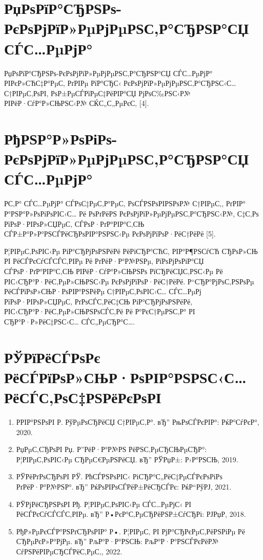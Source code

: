 \documentclass[referat, och, times]{SCWorks}
\begin{document}
	\section{РџРѕРїР°СЂРЅРѕ-РєРѕРјРїР»РµРјРµРЅС‚Р°СЂРЅР°СЏ СЃС…РµРјР°}
	РџРѕРїР°СЂРЅРѕ-РєРѕРјРїР»РµРјРµРЅС‚Р°СЂРЅР°СЏ СЃС…РµРјР° РІРєР»СЋС‡Р°РµС‚ РґРІРµ РїР°СЂС‹ РєРѕРјРїР»РµРјРµРЅС‚Р°СЂРЅС‹С… С†РІРµС‚РѕРІ, РѕР±РµСЃРїРµС‡РёРІР°СЏ РјРѕС‰РЅС‹Р№ РІРёР·СѓР°Р»СЊРЅС‹Р№ СЌС„С„РµРєС‚ [4].
	
	\section{РђРЅР°Р»РѕРіРѕ-РєРѕРјРїР»РµРјРµРЅС‚Р°СЂРЅР°СЏ СЃС…РµРјР°}
	Р­С‚Р° СЃС…РµРјР° СЃРѕС‡РµС‚Р°РµС‚ РѕСЃРЅРѕРІРЅРѕР№ С†РІРµС‚, РґРІР° Р°РЅР°Р»РѕРіРѕРІС‹С… Рё РѕРґРёРЅ РєРѕРјРїР»РµРјРµРЅС‚Р°СЂРЅС‹Р№, С‡С‚Рѕ РїРѕР·РІРѕР»СЏРµС‚ СЃРѕР·РґР°РІР°С‚СЊ СЃР±Р°Р»Р°РЅСЃРёСЂРѕРІР°РЅРЅС‹Рµ РєРѕРјРїРѕР·РёС†РёРё [5].
	
	\conclusion
	Р¦РІРµС‚РѕРІС‹Рµ РіР°СЂРјРѕРЅРёРё РёРіСЂР°СЋС‚ РІР°Р¶РЅСѓСЋ СЂРѕР»СЊ РІ РёСЃРєСѓСЃСЃС‚РІРµ Рё РґРёР·Р°Р№РЅРµ, РїРѕРјРѕРіР°СЏ СЃРѕР·РґР°РІР°С‚СЊ РІРёР·СѓР°Р»СЊРЅРѕ РїСЂРёСЏС‚РЅС‹Рµ Рё РІС‹СЂР°Р·РёС‚РµР»СЊРЅС‹Рµ РєРѕРјРїРѕР·РёС†РёРё. Р“СЂР°РјРѕС‚РЅРѕРµ РёСЃРїРѕР»СЊР·РѕРІР°РЅРёРµ С†РІРµС‚РѕРІС‹С… СЃС…РµРј РїРѕР·РІРѕР»СЏРµС‚ РґРѕСЃС‚РёС‡СЊ РіР°СЂРјРѕРЅРёРё, РІС‹СЂР°Р·РёС‚РµР»СЊРЅРѕСЃС‚Рё Рё Р°РєС†РµРЅС‚Р° РІ СЂР°Р·Р»РёС‡РЅС‹С… СЃС„РµСЂР°С….
	
	\newpage
	\section*{РЎРїРёСЃРѕРє РёСЃРїРѕР»СЊР·РѕРІР°РЅРЅС‹С… РёСЃС‚РѕС‡РЅРёРєРѕРІ}
	\begin{enumerate}
		\item РРІР°РЅРѕРІ Р. РўРµРѕСЂРёСЏ С†РІРµС‚Р°. вЂ” РњРѕСЃРєРІР°: РќР°СѓРєР°, 2020.
		\item РџРµС‚СЂРѕРІ Рџ. Р”РёР·Р°Р№РЅ РёРЅС‚РµСЂСЊРµСЂР°: Р¦РІРµС‚РѕРІС‹Рµ СЂРµС€РµРЅРёСЏ. вЂ” РЎРџР±: Р›Р°РЅСЊ, 2019.
		\item РЎРёРґРѕСЂРѕРІ РЎ. РћСЃРЅРѕРІС‹ РіСЂР°С„РёС‡РµСЃРєРѕРіРѕ РґРёР·Р°Р№РЅР°. вЂ” РќРѕРІРѕСЃРёР±РёСЂСЃРє: РќР“РўРЈ, 2021.
		\item РЎРјРёСЂРЅРѕРІ Рђ. Р¦РІРµС‚РѕРІС‹Рµ СЃС…РµРјС‹ РІ РёСЃРєСѓСЃСЃС‚РІРµ. вЂ” Р•РєР°С‚РµСЂРёРЅР±СѓСЂРі: РЈРџР, 2018.
		\item РђР»РµРєСЃР°РЅРґСЂРѕРІР° Р•. Р¦РІРµС‚ РІ РјР°СЂРєРµС‚РёРЅРіРµ Рё СЂРµРєР»Р°РјРµ. вЂ” РљР°Р·Р°РЅСЊ: РљР°Р·Р°РЅСЃРєРёР№ СѓРЅРёРІРµСЂСЃРёС‚РµС‚, 2022.
	\end{enumerate}
	
\end{document}
